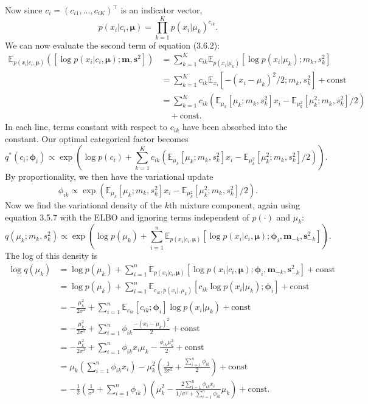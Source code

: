 \documentclass[honours,12pt]{unswthesis}
\numberwithin{equation}{section}
\theoremstyle{definition}
\begin{document}
Now since $c_i=(c_{i1},\dots,c_{iK})^\top$ is an indicator vector,
\[p(x_i|c_i,\bm{\mu})=\prod^K_{k=1}p(x_i|\mu_k)^{c_{ik}}.\]
We can now evaluate the second term of equation (3.6.2):
\begin{align*}
\mathbb{E}_{p(x_i|c_i,\bm{\mu})}\left([\log p(x_i|c_i,\bm{\mu});\bm{m},\bm{s}^2]\right)&=\sum_{k=1}^K c_{ik}\mathbb{E}_{p(x_i|\mu_k)}[\log p(x_i|\mu_k);m_k,s^2_k]\\
&=\sum_{k=1}^K c_{ik}\mathbb{E}_{x_i}[-(x_i-\mu_k)^2/2;m_k,s^2_k]+\text{const}\\
&=\sum_{k=1}^Kc_{ik}\left(\mathbb{E}_{\mu_k}[\mu_k;m_k,s^2_k]x_i-\mathbb{E}_{\mu_k^2}[\mu^2_k;m_k,s^2_k]/2\right)\\
&\quad +\text{const}.
\end{align*}
In each line, terms constant with respect to $c_{ik}$ have been absorbed into the constant. Our optimal categorical factor becomes
\[q^*(c_i;\bm{\phi}_i)\propto \exp \left(\log p(c_i)+\sum_{k=1}^Kc_{ik}\left(\mathbb{E}_{\mu_k}[\mu_k;m_k,s^2_k]x_i-\mathbb{E}_{\mu^2_k}[\mu^2_k;m_k,s^2_k]/2\right)\right).\]
By proportionality, we then have the variational update
\[\phi_{ik}\propto \exp\left(\mathbb{E}_{\mu_k}[\mu_k;m_k,s^2_k]x_i-\mathbb{E}_{\mu^2_k}[\mu^2_k;m_k,s^2_k]/2\right).\]
Now we find the variational density of the $k$th mixture component, again using equation 3.5.7 with the ELBO and ignoring terms independent of $p(\cdot)$ and $\mu_k$:
\[q(\mu_k;m_k,s^2_k)\propto \exp \left(\log p(\mu_k)+\sum^n_{i=1}\mathbb{E}_{p(x_i|c_i,\bm{\mu})}[\log p(x_i|c_i,\bm{\mu});\bm{\phi}_i, \bm{m}_{-k},\bm{s}^2_{-k}]\right).\]
The log of this density is
\begin{align*}
\log q(\mu_k)&=\log p(\mu_k)+\sum_{i=1}^n \mathbb{E}_{p(x_i|c_i,\bm{\mu})}[\log p(x_i|c_i,\bm{\mu});\bm{\phi}_i,\bm{m}_{-k},\bm{s}^2_{-k}]+\text{const}\\
&= \log p(\mu_k)+\sum_{i=1}^n\mathbb{E}_{c_{ik},p(x_i|,\mu_k)}[c_{ik}\log p(x_i|\mu_k);\bm{\phi}_i]+\text{const}\\
&= -\frac{\mu^2_k}{2\sigma^2}+\sum^n_{i=1}\mathbb{E}_{c_{ik}}[c_{ik};\bm{\phi}_i]\log p(x_i|\mu_k)+\text{const}\\
&= -\frac{\mu^2_k}{2\sigma^2}+\sum^n_{i=1}\phi_{ik}\frac{-(x_i-\mu_k)^2}{2}+\text{const}\\
&= -\frac{\mu^2_k}{2\sigma^2}+\sum^n_{i=1} \phi_{ik}x_i\mu_k-\frac{\phi_{ik}\mu^2_k}{2}+\text{const}\\
&= \mu_k\left(\sum^n_{i=1}\phi_{ik}x_i\right)-\mu_k^2\left(\frac{1}{2\sigma^2}+\frac{\sum^n_{i=1}\phi_{ik}}{2}\right)+\text{const}\\
&= -\frac{1}{2}\left(\frac{1}{\sigma^2}+\sum^n_{i=1}\phi_{ik}\right)\left(\mu_k^2-\frac{2\sum^n_{i=1}\phi_{ik}x_i}{1/\sigma^2+\sum^n_{i=1}\phi_{ik}}\mu_k\right)+\text{const}.
\end{align*}
\end{document}

